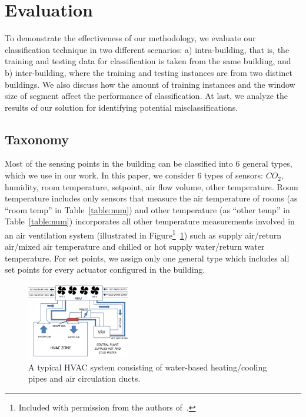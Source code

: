 \section{Evaluation}
To demonstrate the effectiveness of our methodology, we evaluate our classification technique in two different scenarios: a) intra-building, that is, the 
training and testing data for classification is taken from the same building, and b) inter-building, where the training and testing instances are from two 
distinct buildings. We also discuss how the amount of training instances and the window size of segment affect the performance of classification.
At last, we analyze the results of our solution for identifying potential misclassifications.

\subsection{Taxonomy}
Most of the sensing points in the building can be classified into 6 general types, which we use in our work.
In this paper, we consider 6 types of sensors: $CO_{2}$, humidity, room temperature, setpoint, air flow volume, other temperature.  Room 
temperature includes only sensors that measure the air temperature of rooms (as ``room temp'' in Table~\ref{table:num}) and other temperature (as ``other temp'' 
in Table~\ref{table:num}) incorporates all other temperature measurements involved in an air ventilation system (illustrated in Figure\footnote{Included 
with permission from the authors of~\cite{sentinel}.}~\ref{fig:hvac}) such as supply air/return air/mixed air temperature and chilled or hot supply water/return water temperature. 
For set points, we assign only one general type which includes all set points for every actuator configured in the building.

\begin{figure}[ht!]
\centering
\includegraphics[width=0.4\textwidth]{./fig/hvac.pdf}
\caption{A typical HVAC system consisting of water-based heating/cooling pipes and air circulation ducts.}
\label{fig:hvac}
\end{figure}

